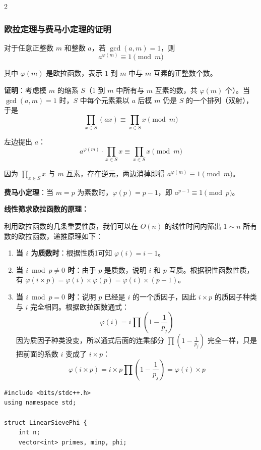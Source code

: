 \begin{multicols*}{2}
		\subsubsection{欧拉定理与费马小定理的证明}

		对于任意正整数 $m$ 和整数 $a$，若 $\gcd(a, m) = 1$，则
		$$a^{\varphi(m)} \equiv 1 \pmod{m}$$

		其中 $\varphi(m)$ 是欧拉函数，表示 $1$ 到 $m$ 中与 $m$ 互素的正整数个数。

		\textbf{证明}：考虑模 $m$ 的缩系 $S$（$1$ 到 $m$ 中所有与 $m$ 互素的数，共 $\varphi(m)$ 个）。当 $\gcd(a, m) = 1$ 时，$S$ 中每个元素乘以 $a$ 后模 $m$ 仍是 $S$ 的一个排列（双射），于是
		$$\prod_{x \in S} (ax) \equiv \prod_{x \in S} x \pmod{m}$$

		左边提出 $a$：
		$$a^{\varphi(m)} \cdot \prod_{x \in S} x \equiv \prod_{x \in S} x \pmod{m}$$

		因为 $\prod_{x \in S} x$ 与 $m$ 互素，存在逆元，两边消掉即得 $a^{\varphi(m)} \equiv 1 \pmod{m}$。

		\textbf{费马小定理}：当 $m = p$ 为素数时，$\varphi(p) = p - 1$，即 $a^{p-1} \equiv 1 \pmod{p}$。

		\textbf{线性筛求欧拉函数的原理：}

		利用欧拉函数的几条重要性质，我们可以在 $O(n)$ 的线性时间内筛出 $1 \sim n$ 所有数的欧拉函数，递推原理如下：
		\begin{enumerate}
			\item \textbf{当 $i$ 为质数时}：根据性质1可知 $\varphi(i) = i - 1$。
			\item \textbf{当 $i \bmod p \neq 0$ 时}：由于 $p$ 是质数，说明 $i$ 和 $p$ 互质。根据积性函数性质，有 $\varphi(i \times p) = \varphi(i) \times \varphi(p) = \varphi(i) \times (p - 1)$。
			\item \textbf{当 $i \bmod p = 0$ 时}：说明 $p$ 已经是 $i$ 的一个质因子，因此 $i \times p$ 的质因子种类与 $i$ 完全相同。根据欧拉函数通式：
			$$
			\varphi(i) = i \prod \left(1 - \frac{1}{p_j}\right)
			$$
			因为质因子种类没变，所以通式后面的连乘部分 $\prod \left(1 - \frac{1}{p_j}\right)$ 完全一样，只是把前面的系数 $i$ 变成了 $i \times p$：
			$$
			\varphi(i \times p) = i \times p \prod \left(1 - \frac{1}{p_j}\right) = \varphi(i) \times p
			$$
		\end{enumerate}

		\begin{verbatim}
#include <bits/stdc++.h>
using namespace std;

struct LinearSievePhi {
	int n;
	vector<int> primes, minp, phi;


\end{verbatim}
\end{multicols*}
